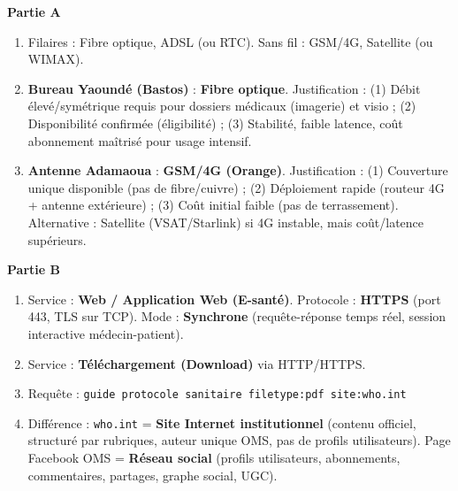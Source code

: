 \documentclass[11pt]{article}
\begin{document}
\begin{corrige}
\textbf{Partie A}
\begin{enumerate}
\item Filaires : Fibre optique, ADSL (ou RTC). Sans fil : GSM/4G, Satellite (ou WIMAX).
\item \textbf{Bureau Yaoundé (Bastos)} : \textbf{Fibre optique}. Justification : (1) Débit élevé/symétrique requis pour dossiers médicaux (imagerie) et visio ; (2) Disponibilité confirmée (éligibilité) ; (3) Stabilité, faible latence, coût abonnement maîtrisé pour usage intensif.
\item \textbf{Antenne Adamaoua} : \textbf{GSM/4G (Orange)}. Justification : (1) Couverture unique disponible (pas de fibre/cuivre) ; (2) Déploiement rapide (routeur 4G + antenne extérieure) ; (3) Coût initial faible (pas de terrassement). Alternative : Satellite (VSAT/Starlink) si 4G instable, mais coût/latence supérieurs.
\end{enumerate}

\textbf{Partie B}
\begin{enumerate}
\item Service : \textbf{Web / Application Web (E-santé)}. Protocole : \textbf{HTTPS} (port 443, TLS sur TCP). Mode : \textbf{Synchrone} (requête-réponse temps réel, session interactive médecin-patient).
\item Service : \textbf{Téléchargement (Download)} via HTTP/HTTPS.
\item Requête : \texttt{guide protocole sanitaire filetype:pdf site:who.int}
\item Différence : \texttt{who.int} = \textbf{Site Internet institutionnel} (contenu officiel, structuré par rubriques, auteur unique OMS, pas de profils utilisateurs). Page Facebook OMS = \textbf{Réseau social} (profils utilisateurs, abonnements, commentaires, partages, graphe social, UGC).
\end{enumerate}


\end{corrige}
\end{document}
